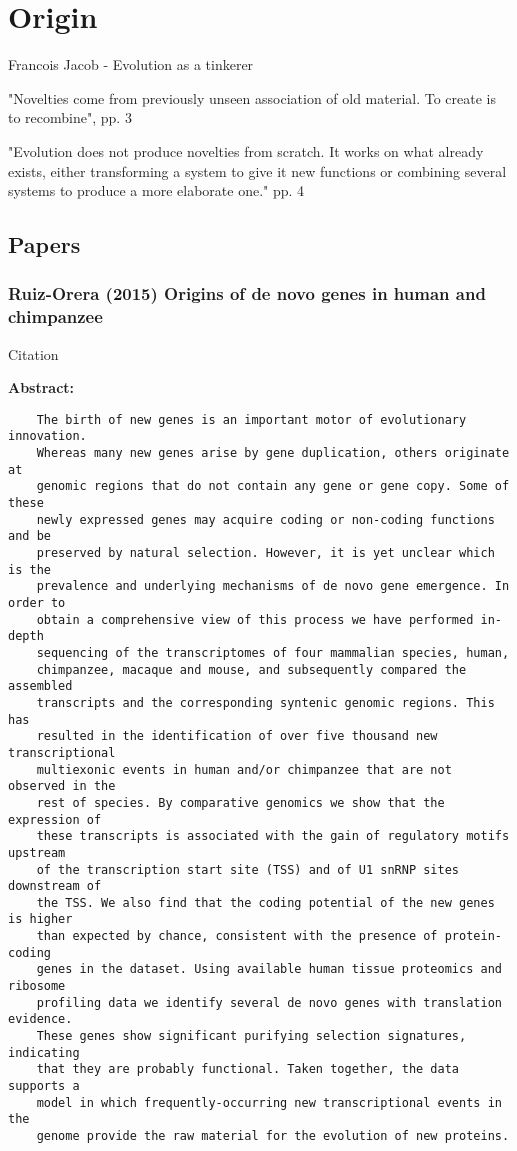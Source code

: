 \section{Origin}

Francois Jacob - Evolution as a tinkerer \cite{jacob_evolution_1977}

"Novelties come from previously unseen association of old material. To create
is to recombine", pp. 3

"Evolution does not produce novelties from scratch. It works on what already
exists, either transforming a system to give it new functions or combining
several systems to produce a more elaborate one." pp. 4

\subsection{Papers}

\subsubsection{Ruiz-Orera (2015) Origins of de novo genes in human and chimpanzee}

    Citation \cite{ruiz-orera_origins_2015}

    \textbf{Abstract:}

    \begin{verbatim}
    The birth of new genes is an important motor of evolutionary innovation.
    Whereas many new genes arise by gene duplication, others originate at
    genomic regions that do not contain any gene or gene copy. Some of these
    newly expressed genes may acquire coding or non-coding functions and be
    preserved by natural selection. However, it is yet unclear which is the
    prevalence and underlying mechanisms of de novo gene emergence. In order to
    obtain a comprehensive view of this process we have performed in-depth
    sequencing of the transcriptomes of four mammalian species, human,
    chimpanzee, macaque and mouse, and subsequently compared the assembled
    transcripts and the corresponding syntenic genomic regions. This has
    resulted in the identification of over five thousand new transcriptional
    multiexonic events in human and/or chimpanzee that are not observed in the
    rest of species. By comparative genomics we show that the expression of
    these transcripts is associated with the gain of regulatory motifs upstream
    of the transcription start site (TSS) and of U1 snRNP sites downstream of
    the TSS. We also find that the coding potential of the new genes is higher
    than expected by chance, consistent with the presence of protein-coding
    genes in the dataset. Using available human tissue proteomics and ribosome
    profiling data we identify several de novo genes with translation evidence.
    These genes show significant purifying selection signatures, indicating
    that they are probably functional. Taken together, the data supports a
    model in which frequently-occurring new transcriptional events in the
    genome provide the raw material for the evolution of new proteins.
    \end{verbatim}

